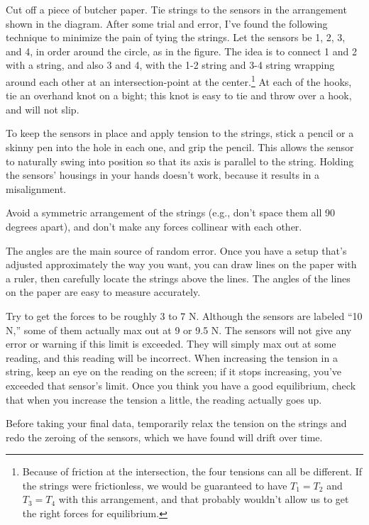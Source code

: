Cut off a piece of butcher paper. Tie strings to the sensors in the arrangement shown in the diagram.
After some trial and error, I've found the following technique to minimize the
pain of tying the strings. Let the sensors be 1, 2, 3, and 4, in order around the
circle, as in the figure. The idea is to connect 1 and 2 with a string, and also
3 and 4, with the 1-2 string and 3-4 string wrapping around each other at an intersection-point at the 
center.\footnote{Because of friction at the intersection, the four tensions can all be different.
If the strings
were frictionless, we would be guaranteed to have $T_1=T_2$ and $T_3=T_4$ with this arrangement, and
that probably wouldn't allow us to get the right forces for equilibrium.}
At each of the hooks, tie an overhand knot on a bight; this knot is easy
to tie and throw over a hook, and will not slip.

To keep the sensors in place and apply tension to the strings, stick a pencil or a skinny
pen into the hole in each one, and grip the pencil. This allows the sensor to naturally swing
into position so that its axis is parallel to the string. Holding the sensors' housings in your
hands doesn't work, because it results in a misalignment.

Avoid a symmetric arrangement of
the strings (e.g., don't space them all 90 degrees apart), and
don't make any forces collinear with each other. 


The angles are the main source of random error. Once you have a setup that's adjusted
approximately the way you want, you can draw lines on the paper
with a ruler, then carefully locate the strings above the lines. The angles of the lines on
the paper are easy to measure accurately.

Try to get the forces to be roughly 3 to 7 N.
Although the sensors are labeled ``10 N,'' some of them actually max out at 9 or 9.5 N.
The sensors will not give any
error or warning if this limit is exceeded. They will simply max out at some
reading, and this reading will be incorrect. When increasing the tension in a string, keep an eye
on the reading on the screen; if it stops increasing, you've exceeded that sensor's limit.
Once you think you have a good equilibrium, check that when you increase the tension a little, the
reading actually goes up.

Before taking your final data, temporarily relax the tension on the strings and redo the zeroing of the
sensors, which we have found will drift over time.

